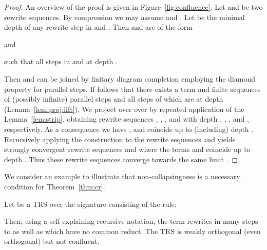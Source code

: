 \begin{proof}
  An overview of the proof is given in Figure~\ref{fig:confluence}.
  Let  and  be two rewrite sequences.
  By compression we may assume  and .
  Let  be the minimal depth of any rewrite step in  and .
  Then  and  are of the form
  
  and
  
  such that all steps in  and  at depth .
  
  Then  and  can be joined by finitary diagram completion employing the diamond property for parallel steps.
  If follows that there exists a term  and finite sequences of (possibly infinite) parallel steps  and 
  all steps of which are at depth  (Lemma~\ref{lem:proj:lift}).
  We project 
   over  
   over  
  by repeated application of the Lemma~\ref{lem:strip},
  obtaining rewrite sequences 
  ,
  ,
  , and
   with depth , , , and , respectively.
  As a consequence we have ,  and  coincide up to (including) depth .
  Recursively applying the construction to the rewrite sequences  and 
  yields strongly convergent rewrite sequences 
   and 
  where the terms  and  coincide up to depth .
  Thus these rewrite sequences converge towards the same limit .
\end{proof}

We consider an example to illustrate that non-collapsingness is a necessary condition for Theorem~\ref{thm:cr}.
\begin{example}\label{ex:collapse}
  Let  be a TRS over the signature  consisting of the rule:
  
  Then, using a self-explaining recursive notation, 
  the term  rewrites in  many steps to 
   as well as  which have no common reduct.
  The TRS  is weakly orthogonal (even orthogonal) but not confluent.
\end{example}

